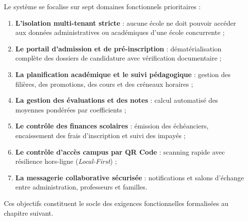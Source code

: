 Le système se focalise sur sept domaines fonctionnels prioritaires :
\begin{enumerate}
  \item \textbf{L'isolation multi-tenant stricte} : aucune école ne doit pouvoir accéder aux données administratives ou académiques d'une école concurrente ;
  \item \textbf{Le portail d'admission et de pré-inscription} : dématérialisation complète des dossiers de candidature avec vérification documentaire ;
  \item \textbf{La planification académique et le suivi pédagogique} : gestion des filières, des promotions, des cours et des créneaux horaires ;
  \item \textbf{La gestion des évaluations et des notes} : calcul automatisé des moyennes pondérées par coefficients ;
  \item \textbf{Le contrôle des finances scolaires} : émission des échéanciers, encaissement des frais d'inscription et suivi des impayés ;
  \item \textbf{Le contrôle d'accès campus par QR Code} : scanning rapide avec résilience hors-ligne (\emph{Local-First}) ;
  \item \textbf{La messagerie collaborative sécurisée} : notifications et salons d'échange entre administration, professeurs et familles.
\end{enumerate}

Ces objectifs constituent le socle des exigences fonctionnelles formalisées au chapitre suivant.
